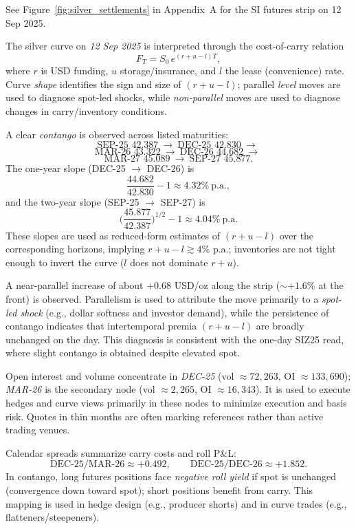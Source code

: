 \documentclass[11pt,a4paper]{article} %
\begin{document}
See Figure~\ref{fig:silver_settlements} in Appendix~A for the SI futures strip on 12 Sep 2025.

The silver curve on \emph{12 Sep 2025} is interpreted through the cost-of-carry relation
\[
F_T = S_0\,e^{(r+u-l)T},
\]
where \(r\) is USD funding, \(u\) storage/insurance, and \(l\) the lease (convenience) rate. Curve \emph{shape} identifies the sign and size of \((r+u-l)\); parallel \emph{level} moves are used to diagnose spot-led shocks, while \emph{non-parallel} moves are used to diagnose changes in carry/inventory conditions.



A clear \emph{contango} is observed across listed maturities:
\[
\text{SEP-25 } {42.387}\ \rightarrow\ \text{DEC-25 } {42.830}\ \rightarrow\ 
\]
\[
\text{MAR-26 } {43.322}\ \rightarrow\ \text{DEC-26 } {44.682}\ \rightarrow\ 
\]
\[
\text{MAR-27 } {45.089}\ \rightarrow\ \text{SEP-27 } {45.877}.
\]
The one-year slope (DEC-25 \(\rightarrow\) DEC-26) is
\[
\frac{44.682}{42.830}-1 \approx {4.32\%}\ \text{p.a.},
\]
and the two-year slope (SEP-25 \(\rightarrow\) SEP-27) is
\[
\Big(\frac{45.877}{42.387}\Big)^{1/2}-1 \approx {4.04\%}\ \text{p.a.}
\]
These slopes are used as reduced-form estimates of \((r+u-l)\) over the corresponding horizons, implying \(r+u-l\gtrsim 4\%\) p.a.; inventories are not tight enough to invert the curve (\(l\) does not dominate \(r+u\)).

A near-parallel increase of about \({+0.68}\) USD/oz along the strip (\(\sim {+1.6\%}\) at the front) is observed. Parallelism is used to attribute the move primarily to a \emph{spot-led shock} (e.g., dollar softness and investor demand), while the persistence of contango indicates that intertemporal premia \((r+u-l)\) are broadly unchanged on the day. This diagnosis is consistent with the one-day SIZ25 read, where slight contango is obtained despite elevated spot.


Open interest and volume concentrate in \textit{DEC-25} (vol \(\approx 72{,}263\), OI \(\approx 133{,}690\)); \textit{MAR-26} is the secondary node (vol \(\approx 2{,}265\), OI \(\approx 16{,}343\)). It is used to execute hedges and curve views primarily in these nodes to minimize execution and basis risk. Quotes in thin months are often marking references rather than active trading venues.


Calendar spreads summarize carry costs and roll P\&L:
\[
\text{DEC-25/MAR-26} \approx +0.492,\qquad \text{DEC-25/DEC-26} \approx +1.852.
\]
In contango, long futures positions face \emph{negative roll yield} if spot is unchanged (convergence down toward spot); short positions benefit from carry. This mapping is used in hedge design (e.g., producer shorts) and in curve trades (e.g., flatteners/steepeners).
\end{document}
